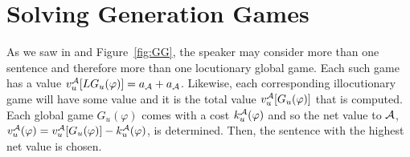 \section{Solving Generation Games} \label{sec:solving generation games}
As we saw in  and Figure~\ref{fig:GG}, the speaker may consider more than one sentence and therefore more than one locutionary global game. Each such game has a value $v_u^{\cal A}[LG_u(\varphi)] = a_{\cal A} + a_{\cal A}$. Likewise, each corresponding illocutionary game will have some value and it is the total value $v_u^{\cal A}[G_u(\varphi)]$ that is computed. Each global game $G_u(\varphi)$ comes with a cost $k^{\cal A}_u(\varphi)$ and so the net value to $\cal A$, $v_u^{\cal A}(\varphi) = v_u^{\cal A}[G_u(\varphi)] - k^{\cal A}_u(\varphi)$, is determined. Then, the sentence with the highest net value is chosen.

